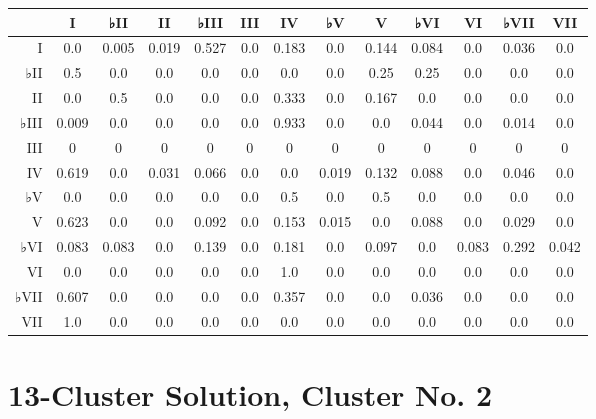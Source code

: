 \begin{table}[htbp]
\begin{minipage}{\linewidth}
\setlength{\tymax}{0.5\linewidth}
\centering
\small
\begin{tabulary}{\textwidth}{@{}RCCCCCCCCCCCC@{}} \toprule
&I&♭II&II&♭III&III&IV&♭V&V&♭VI&VI&♭VII&VII\\
\midrule
I&0.0&0.005&0.019&0.527&0.0&0.183&0.0&0.144&0.084&0.0&0.036&0.0\\
♭II&0.5&0.0&0.0&0.0&0.0&0.0&0.0&0.25&0.25&0.0&0.0&0.0\\
II&0.0&0.5&0.0&0.0&0.0&0.333&0.0&0.167&0.0&0.0&0.0&0.0\\
♭III&0.009&0.0&0.0&0.0&0.0&0.933&0.0&0.0&0.044&0.0&0.014&0.0\\
III&0&0&0&0&0&0&0&0&0&0&0&0\\
IV&0.619&0.0&0.031&0.066&0.0&0.0&0.019&0.132&0.088&0.0&0.046&0.0\\
♭V&0.0&0.0&0.0&0.0&0.0&0.5&0.0&0.5&0.0&0.0&0.0&0.0\\
V&0.623&0.0&0.0&0.092&0.0&0.153&0.015&0.0&0.088&0.0&0.029&0.0\\
♭VI&0.083&0.083&0.0&0.139&0.0&0.181&0.0&0.097&0.0&0.083&0.292&0.042\\
VI&0.0&0.0&0.0&0.0&0.0&1.0&0.0&0.0&0.0&0.0&0.0&0.0\\
♭VII&0.607&0.0&0.0&0.0&0.0&0.357&0.0&0.0&0.036&0.0&0.0&0.0\\
VII&1.0&0.0&0.0&0.0&0.0&0.0&0.0&0.0&0.0&0.0&0.0&0.0\\

\bottomrule

\end{tabulary}
\end{minipage}
\end{table}

\section{13-Cluster Solution, Cluster No. 2}
\label{13-clustersolutionclusterno.2}

